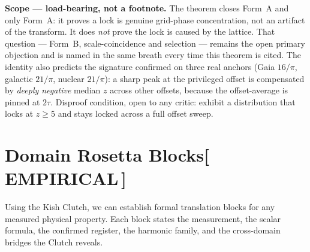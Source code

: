 \documentclass[12pt,oneside]{book}
\newcommand{\EmpiricalTag}{\;\colorbox{empiricaltag!15}{\textcolor{empiricaltag}{\footnotesize\bfseries [\,EMPIRICAL\,]}}}
\begin{document}
\vspace{0.4em}
\noindent\textbf{Scope --- load-bearing, not a footnote.} The theorem closes Form~A and
only Form~A: it proves a lock is genuine grid-phase concentration, not an artifact of the
transform. It does \emph{not} prove the lock is caused by the lattice. That question ---
Form~B, scale-coincidence and selection --- remains the open primary objection and is
named in the same breath every time this theorem is cited. The identity also predicts the
signature confirmed on three real anchors (Gaia $16/\pi$, galactic $21/\pi$, nuclear
$21/\pi$): a sharp peak at the privileged offset is compensated by \emph{deeply negative}
median $z$ across other offsets, because the offset-average is pinned at $2\tau$. Disproof
condition, open to any critic: exhibit a distribution that locks at $z\ge 5$ and stays
locked across a full offset sweep.

\section{Domain Rosetta Blocks\EmpiricalTag}

Using the Kish Clutch, we can establish formal translation blocks for any measured
physical property. Each block states the measurement, the scalar formula, the confirmed
register, the harmonic family, and the cross-domain bridges the Clutch reveals.
\end{document}
